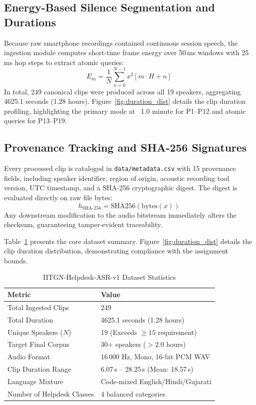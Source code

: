 \documentclass[10pt,journal,compsoc]{IEEEtran}
\begin{document}
\subsection{Energy-Based Silence Segmentation and Durations}
Because raw smartphone recordings contained continuous session speech, the ingestion module computes short-time frame energy over 50\,ms windows with 25\,ms hop steps to extract atomic queries:
\begin{equation}
E_m = \frac{1}{N}\sum_{n=0}^{N-1} x^2[m \cdot H + n]
\end{equation}
In total, 249 canonical clips were produced across all 19 speakers, aggregating 4625.1 seconds (1.28 hours). Figure~\ref{fig:duration_dist} details the clip duration profiling, highlighting the primary mode at ~1.0 minute for P1--P12 and atomic queries for P13--P19.

\subsection{Provenance Tracking and SHA-256 Signatures}
Every processed clip is cataloged in \texttt{data/metadata.csv} with 15 provenance fields, including speaker identifier, region of origin, acoustic recording tool version, UTC timestamp, and a SHA-256 cryptographic digest. The digest is evaluated directly on raw file bytes:
\begin{equation}
h_{\text{SHA-256}} = \text{SHA256}(\text{bytes}(x))
\end{equation}
Any downstream modification to the audio bitstream immediately alters the checksum, guaranteeing tamper-evident traceability.

Table~\ref{tab:dataset_stats} presents the core dataset summary. Figure~\ref{fig:duration_dist} details the clip duration distribution, demonstrating compliance with the assignment bounds.

\begin{table}[h]
\centering
\caption{IITGN-Helpdesk-ASR-v1 Dataset Statistics}
\label{tab:dataset_stats}
\begin{tabular}{ll}
\toprule
\textbf{Metric} & \textbf{Value} \\
\midrule
Total Ingested Clips & 249 \\
Total Duration & 4625.1 seconds (1.28 hours) \\
Unique Speakers ($N$) & 19 (Exceeds $\ge 15$ requirement) \\
Target Final Corpus & 30+ speakers ($>2.0$ hours) \\
Audio Format & 16\,000 Hz, Mono, 16-bit PCM WAV \\
Clip Duration Range & 6.07\,s -- 28.25\,s (Mean: 18.57\,s) \\
Language Mixture & Code-mixed English/Hindi/Gujarati \\
Number of Helpdesk Classes & 4 balanced categories \\
\bottomrule
\end{tabular}
\end{table}
\end{document}

